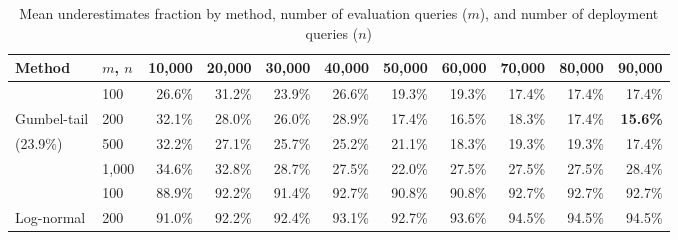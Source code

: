 \begin{table}[h]
\centering
\begin{tabular}{llrrrrrrrrr}
\toprule
Method & $m$, $n$ & 10,000 & 20,000 & 30,000 & 40,000 & 50,000 & 60,000 & 70,000 & 80,000 & 90,000 \\
\midrule
 & 100 & 26.6\% & 31.2\% & 23.9\% & 26.6\% & 19.3\% & 19.3\% & 17.4\% & 17.4\% & 17.4\% \\
Gumbel-tail & 200 & 32.1\% & 28.0\% & 26.0\% & 28.9\% & 17.4\% & 16.5\% & 18.3\% & 17.4\% & \textbf{15.6\%} \\
(23.9\%) & 500 & 32.2\% & 27.1\% & 25.7\% & 25.2\% & 21.1\% & 18.3\% & 19.3\% & 19.3\% & 17.4\% \\
& 1,000 & 34.6\% & 32.8\% & 28.7\% & 27.5\% & 22.0\% & 27.5\% & 27.5\% & 27.5\% & 28.4\% \\
\midrule
& 100 & 88.9\% & 92.2\% & 91.4\% & 92.7\% & 90.8\% & 90.8\% & 92.7\% & 92.7\% & 92.7\% \\
Log-normal & 200 & 91.0\% & 92.2\% & 92.4\% & 93.1\% & 92.7\% & 93.6\% & 94.5\% & 94.5\% & 94.5\% \\
\bottomrule
\end{tabular}
\caption{Mean underestimates fraction by method, number of evaluation queries ($m$), and number of deployment queries ($n$)}
\end{table}



